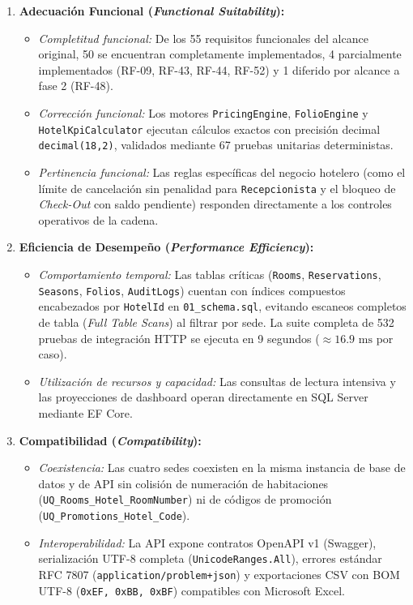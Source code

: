 \documentclass[12pt,a4paper]{article}
\begin{document}
\begin{enumerate}
    \item \textbf{Adecuaci\'on Funcional (\textit{Functional Suitability}):}
    \begin{itemize}
        \item \textit{Completitud funcional:} De los 55 requisitos funcionales del alcance original, 50 se encuentran completamente implementados, 4 parcialmente implementados (RF-09, RF-43, RF-44, RF-52) y 1 diferido por alcance a fase 2 (RF-48).
        \item \textit{Correcci\'on funcional:} Los motores \texttt{PricingEngine}, \texttt{FolioEngine} y \texttt{HotelKpiCalculator} ejecutan c\'alculos exactos con precisi\'on decimal \texttt{decimal(18,2)}, validados mediante 67 pruebas unitarias deterministas.
        \item \textit{Pertinencia funcional:} Las reglas espec\'ificas del negocio hotelero (como el l\'imite de cancelaci\'on sin penalidad para \texttt{Recepcionista} y el bloqueo de \textit{Check-Out} con saldo pendiente) responden directamente a los controles operativos de la cadena.
    \end{itemize}

    \item \textbf{Eficiencia de Desempe\~no (\textit{Performance Efficiency}):}
    \begin{itemize}
        \item \textit{Comportamiento temporal:} Las tablas cr\'iticas (\texttt{Rooms}, \texttt{Reservations}, \texttt{Seasons}, \texttt{Folios}, \texttt{AuditLogs}) cuentan con \'indices compuestos encabezados por \texttt{HotelId} en \texttt{01\_schema.sql}, evitando escaneos completos de tabla (\textit{Full Table Scans}) al filtrar por sede. La suite completa de 532 pruebas de integraci\'on HTTP se ejecuta en 9 segundos ($\approx 16.9\text{ ms}$ por caso).
        \item \textit{Utilizaci\'on de recursos y capacidad:} Las consultas de lectura intensiva y las proyecciones de dashboard operan directamente en SQL Server mediante EF Core.
    \end{itemize}

    \item \textbf{Compatibilidad (\textit{Compatibility}):}
    \begin{itemize}
        \item \textit{Coexistencia:} Las cuatro sedes coexisten en la misma instancia de base de datos y de API sin colisi\'on de numeraci\'on de habitaciones (\texttt{UQ\_Rooms\_Hotel\_RoomNumber}) ni de c\'odigos de promoci\'on (\texttt{UQ\_Promotions\_Hotel\_Code}).
        \item \textit{Interoperabilidad:} La API expone contratos OpenAPI v1 (Swagger), serializaci\'on UTF-8 completa (\texttt{UnicodeRanges.All}), errores est\'andar RFC 7807 (\texttt{application/problem+json}) y exportaciones CSV con BOM UTF-8 (\texttt{0xEF, 0xBB, 0xBF}) compatibles con Microsoft Excel.
    \end{itemize}


\end{enumerate}
\end{document}

